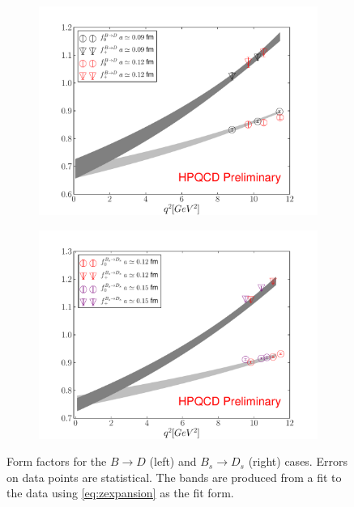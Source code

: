 \begin{figure}
\centering
\begin{subfigure}{.5\textwidth}
  \centering
  \includegraphics[width=1.0\linewidth]{images/BD_proceedings17.pdf}
  \label{fig:BD_ff}
\end{subfigure}%
\begin{subfigure}{.5\textwidth}
  \centering
  \includegraphics[width=1.0\linewidth]{images/BsDs_proceedings17.pdf}
  \label{fig:BsDs_ff}
\end{subfigure}
\caption{Form factors for the $B\to D$ (left) and $B_s \to D_s$ (right) cases. Errors on data points are statistical. The bands are produced from a fit to the data using \eqref{eq:zexpansion} as the fit form. \label{fig:ff}}
\end{figure}

